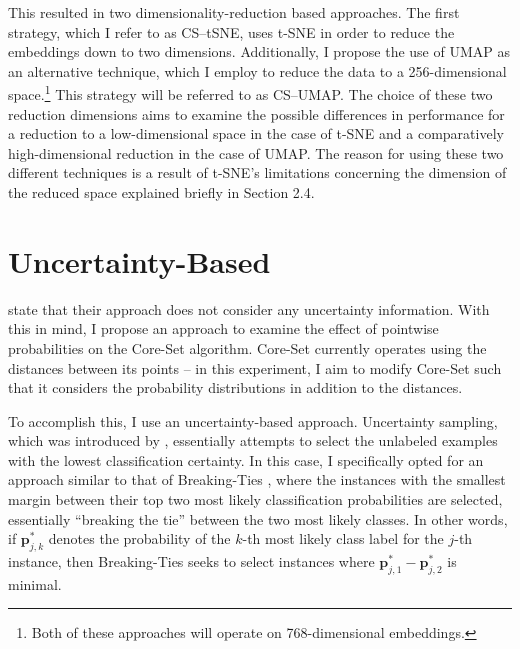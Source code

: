 \documentclass[english,bachelor,ul]{webisthesis} %
\begin{document}
This resulted in two dimensionality-reduction based approaches. The first strategy, which I refer to as CS--tSNE, uses t-SNE in order to reduce the embeddings down to two dimensions. Additionally, I propose the use of UMAP as an alternative technique, which I employ to reduce the data to a 256-dimensional space.\footnote{Both of these approaches will operate on 768-dimensional embeddings.} This strategy will be referred to as CS--UMAP. The choice of these two reduction dimensions aims to examine the possible differences in performance for a reduction to a low-dimensional space in the case of t-SNE and a comparatively high-dimensional reduction in the case of UMAP. The reason for using these two different techniques is a result of t-SNE's limitations concerning the dimension of the reduced space explained briefly in Section 2.4.

\section{Uncertainty-Based}

\cite{DBLP:conf/iclr/SenerS18} state that their approach does not consider any uncertainty information. With this in mind, I propose an approach to examine the effect of pointwise probabilities on the Core-Set algorithm. Core-Set currently operates using the distances between its points -- in this experiment, I aim to modify Core-Set such that it considers the probability distributions in addition to the distances.

To accomplish this, I use an uncertainty-based approach. Uncertainty sampling, which was introduced by \cite{DBLP:conf/sigir/LewisG94}, essentially attempts to select the unlabeled examples with the lowest classification certainty. In this case, I specifically opted for an approach similar to that of Breaking-Ties \citep{DBLP:journals/jmlr/LuoKGHSRH05}, where the instances with the smallest margin between their top two most likely classification probabilities are selected, essentially ``breaking the tie'' between the two most likely classes. In other words, if $ \mathbf{p}_{j, k}^* $ denotes the probability of the $ k $-th most likely class label for the $ j $-th instance, then Breaking-Ties seeks to select instances where $ \mathbf{p}_{j, 1}^* - \mathbf{p}_{j, 2}^* $ is minimal.
\end{document}
